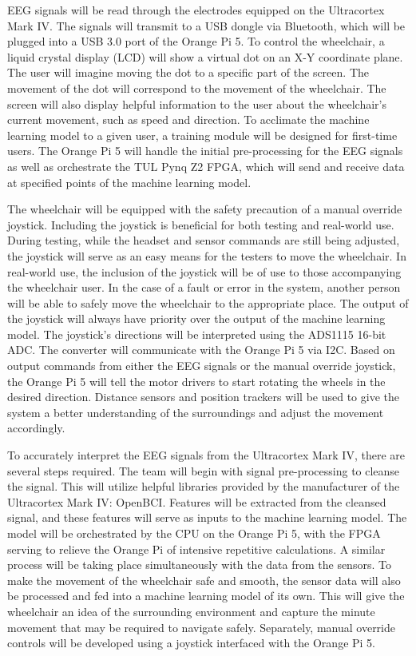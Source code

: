 \documentclass[conference]{IEEEtran}
\begin{document}
    EEG signals will be read through the electrodes equipped on the Ultracortex Mark IV. The signals will transmit to a USB dongle via Bluetooth, which will be plugged into a USB 3.0 port of the Orange Pi 5. To control the wheelchair, a liquid crystal display (LCD) will show a virtual dot on an X-Y coordinate plane. The user will {imagine moving} the dot to a specific part of the screen. The movement of the dot will correspond to the movement of the wheelchair. The screen will also display helpful information to the user about the wheelchair's current movement, such as speed and direction. To acclimate the machine learning model to a given user, a training module will be designed for first-time users. The Orange Pi 5 will handle the initial pre-processing for the EEG signals as well as orchestrate the TUL Pynq Z2 FPGA, which will send and receive data at specified points of the machine learning model. 
    
    The wheelchair will be equipped with the safety precaution of a manual override joystick. {Including the joystick is beneficial for both testing and real-world use. During testing, while the headset and sensor commands are still being adjusted, the joystick will serve as an easy means for the testers to move the wheelchair. In real-world use, the inclusion of the joystick will be of use to those accompanying the wheelchair user. In the case of a fault or error in the system, another person will be able to safely move the wheelchair to the appropriate place.} The output of the joystick will always have priority over the output of the machine learning model. The joystick's directions will be interpreted using the ADS1115 16-bit ADC. The converter will communicate with the Orange Pi 5 via I2C. Based on output commands from either the EEG signals or the manual override joystick, the Orange Pi 5 will tell the motor drivers to start rotating the wheels in the desired direction. Distance sensors and position trackers will be used to give the system a better understanding of the surroundings and adjust the movement accordingly. 

    To accurately interpret the EEG signals from the Ultracortex Mark IV, there are several steps required. The team will begin with signal pre-processing to cleanse the signal. This will utilize helpful libraries provided by the manufacturer of the Ultracortex Mark IV: OpenBCI. Features will be extracted from the cleansed signal, and these features will serve as inputs to the machine learning model. The model will be orchestrated by the CPU on the Orange Pi 5, with the FPGA serving to relieve the Orange Pi of intensive repetitive calculations. A similar process will be taking place simultaneously with the data from the sensors. To make the movement of the wheelchair safe and smooth, the sensor data will also be processed and fed into a machine learning model of its own. This will give the wheelchair an idea of the surrounding environment and capture the minute movement that may be required to navigate safely. Separately, manual override controls will be developed using a joystick interfaced with the Orange Pi 5.
\end{document}
